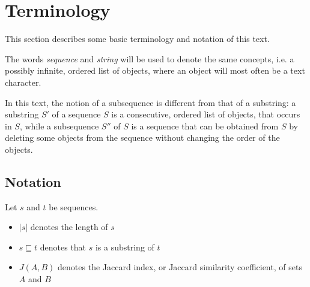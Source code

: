 \section{Terminology}
This section describes some basic terminology and notation of this text.

The words \emph{sequence} and \emph{string} will be used to denote the same
concepts, i.e. a possibly infinite, ordered list of objects, where an object
will most often be a text character.

In this text, the notion of a subsequence is different from that of a
substring: a substring $S'$ of a sequence $S$ is a consecutive, ordered list of
objects, that occurs in $S$, while a subsequence $S''$ of $S$ is a sequence
that can be obtained from $S$ by deleting some objects from the sequence
without changing the order of the objects.


\subsection{Notation}
Let $s$ and $t$ be sequences.
\begin{itemize}
  \item $|s|$ denotes the length of $s$
  \item $s \sqsubseteq t$ denotes that $s$ is a substring of $t$
  \item $J(A,B)$ denotes the Jaccard index, or Jaccard similarity coefficient,
    of sets $A$ and $B$
\end{itemize}
